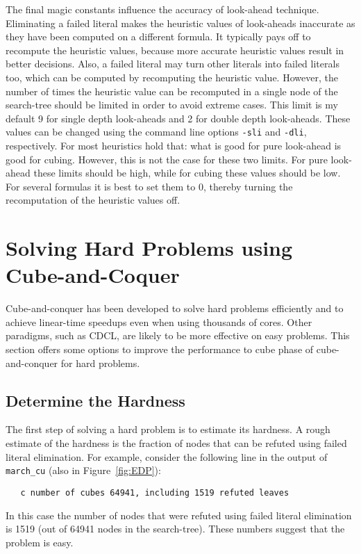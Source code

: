\documentclass{llncs}
\begin{document}
The final magic constants influence the accuracy of look-ahead technique. Eliminating a failed literal makes the heuristic values
of look-aheads inaccurate as they have been computed on a different formula. It typically pays off to recompute the heuristic 
values, because more accurate heuristic values result in better decisions. Also, a failed literal may turn other literals into failed
literals too, which can be computed by recomputing the heuristic value. However, the number of times the 
heuristic value can be recomputed in a single node of the search-tree should be limited in order to avoid extreme cases.
This limit is my default 9 for single depth look-aheads  and 2 for double depth look-aheads. These values can be changed using
the command line options {\tt -sli} and {\tt -dli}, respectively. For most heuristics hold that: what is good for pure look-ahead is 
good for cubing. However, this is not the case for these two limits. For pure look-ahead these limits should be high, while for 
cubing these values should be low. For several formulas it is best to set them to 0, thereby turning the recomputation of 
the heuristic values off.

\section{Solving Hard Problems using Cube-and-Coquer}

Cube-and-conquer has been developed to solve hard problems efficiently and to achieve linear-time speedups even when using
thousands of cores. Other paradigms, such as CDCL, are likely to be more effective on easy problems. This section offers some 
options to improve the performance to cube phase of cube-and-conquer for hard problems. 

\subsection{Determine the Hardness}

The first step of solving a hard problem is to estimate its hardness. A rough estimate of the hardness is the fraction of nodes that can
be refuted using failed literal elimination. For example, consider the following line in
the output of {\tt march\_cu} (also in Figure~\ref{fig:EDP}):
%
\begin{verbatim}
   c number of cubes 64941, including 1519 refuted leaves
\end{verbatim}
%
In this case the number of nodes that were refuted using failed literal elimination is 1519 (out of 64941 nodes in the search-tree). 
These numbers suggest that the problem is easy. 
\end{document}

